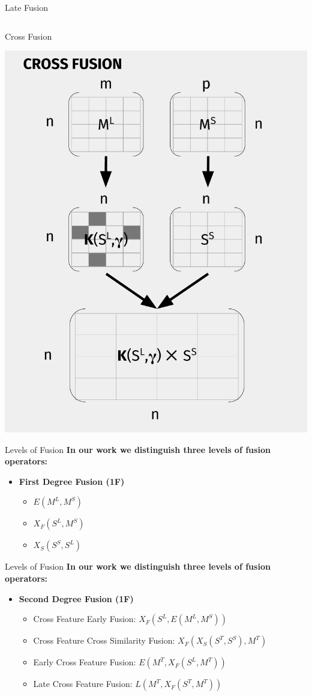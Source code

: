 \documentclass[10pt,xcolor=table]{beamer}
\begin{document}
\begin{frame}{Late Fusion}
\begin{columns}
\begin{minipage}[c][0.5\textheight][c]{\linewidth}
	\end{minipage}
\end{columns}

\end{frame}

\begin{frame}{Cross Fusion}
\begin{center}
\includegraphics[width=.55\linewidth]{image2/Chapitre3/xf_diag.pdf}
\end{center}
\end{frame}


\begin{frame}[t]{Levels of Fusion}
\large \textbf{In our work we distinguish three levels of fusion operators:} 
\vspace{.5cm}
\begin{itemize}
\item  \textbf{First Degree Fusion (1F)}
	\begin{itemize}
	\item $E(M^L, M^S)$
	\item $X_F(S^L, M^S)$
	\item $X_S(S^S, S^L)$
	\end{itemize}
\end{itemize}
\end{frame}

\begin{frame}[t]{Levels of Fusion}
\large \textbf{In our work we distinguish three levels of fusion operators:} 
\vspace{.5cm}
\begin{itemize}
\item  \textbf{Second Degree Fusion (1F)}
	\begin{itemize}
	\item Cross Feature Early Fusion: $X_F(S^L, E(M^L, M^S))$
	\item Cross Feature Cross Similarity Fusion: $X_F(X_S(S^T,S^S),M^T)$
	\item Early Cross Feature Fusion:  $E(M^T , X_F(S^L , M^T ))$
	\item Late Cross Feature Fusion: $L(M^T , X_F(S^T , M^T ))$
	\end{itemize}
\end{itemize}
\end{frame}
\end{document}
